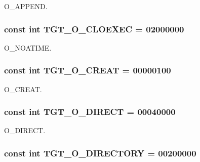 O\_\-APPEND. \hypertarget{classArmLinux64_a34aa7ec867a12296e12a851c47fb56d4}{
\subsubsection[{TGT\_\-O\_\-CLOEXEC}]{\setlength{\rightskip}{0pt plus 5cm}const int {\bf TGT\_\-O\_\-CLOEXEC} = 02000000}}
\label{classArmLinux64_a34aa7ec867a12296e12a851c47fb56d4}


O\_\-NOATIME. \hypertarget{classArmLinux64_aec02e04ca367e6c3f4b46e4edc12efac}{
\subsubsection[{TGT\_\-O\_\-CREAT}]{\setlength{\rightskip}{0pt plus 5cm}const int {\bf TGT\_\-O\_\-CREAT} = 00000100}}
\label{classArmLinux64_aec02e04ca367e6c3f4b46e4edc12efac}


O\_\-CREAT. \hypertarget{classArmLinux64_ae5d685a6a2ee8c6fe0ede370f0bec588}{
\subsubsection[{TGT\_\-O\_\-DIRECT}]{\setlength{\rightskip}{0pt plus 5cm}const int {\bf TGT\_\-O\_\-DIRECT} = 00040000}}
\label{classArmLinux64_ae5d685a6a2ee8c6fe0ede370f0bec588}


O\_\-DIRECT. \hypertarget{classArmLinux64_a1f10d158ad65ad6389078ba44629788a}{
\subsubsection[{TGT\_\-O\_\-DIRECTORY}]{\setlength{\rightskip}{0pt plus 5cm}const int {\bf TGT\_\-O\_\-DIRECTORY} = 00200000}}
\label{classArmLinux64_a1f10d158ad65ad6389078ba44629788a}


